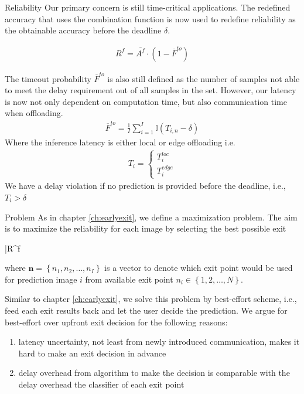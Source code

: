 \begin{enumdescript}
	\item[Reliability]  Our primary concern is still time-critical applications. The redefined accuracy that uses the combination function is now used to redefine reliability as the obtainable accuracy before the deadline $ \delta $.
	
	\begin{align}
	R^f= \bar{A^f} \cdot (1-\overline{F}^{to})
	\end{align}
	
	The timeout probability $ \overline{F}^{to} $ is also still defined as the number of samples not able to meet the delay requirement out of all samples in the set. However, our latency is now not only dependent on computation time, but also communication time when offloading.
	\begin{align}
	\overline{F}^{to}=\frac{1}{I}\sum_{i=1}^{I} \mathbb{I}\left(T_{i,n}-\delta\right)
	\end{align}
	Where the inference latency is either local or edge offloading i.e.
	\begin{align*}
	T_{i} = \begin{cases}
	T_{i}^{loc} \\
	T_{i}^{edge}
	\end{cases}
	\end{align*}
	We have a delay violation if no prediction is provided before the deadline, i.e., $ T_{i} > \delta $  
	
	\item[Problem] As in chapter \ref{ch:earlyexit}, we define a maximization problem. The aim is to maximize the reliability for each image by selecting the best possible exit
	\begin{maxi}
		{}{\bar{R}^f}
		{}{}
	\end{maxi}
	where $ \bm{n} = \left\{ n_1, n_2, \dots, n_I \right\}$ is a vector to denote which exit point would be used for prediction image $ i $ from available exit point $ n_i \in \left\{1,2, \dots, N\right\} $.
	
	Similar to chapter \ref{ch:earlyexit}, we solve this problem by best-effort scheme, i.e., feed each exit results back and let the user decide the prediction. We argue for best-effort over upfront exit decision for the following reasons:
	\begin{enumerate}
		\item latency uncertainty, not least from newly introduced communication, makes it hard to make an exit decision in advance
		\item delay overhead from algorithm to make the decision is comparable with the delay overhead the classifier of each exit point \cite{li_edge_2018}
	\end{enumerate}
	
	
\end{enumdescript}  


